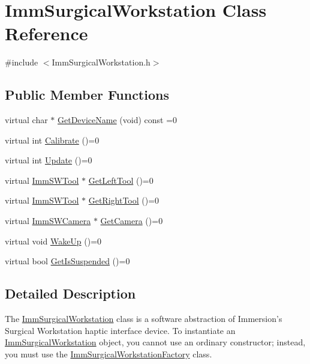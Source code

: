 \hypertarget{classImmSurgicalWorkstation}{
\section{ImmSurgicalWorkstation Class Reference}
\label{classImmSurgicalWorkstation}
}


{\ttfamily \#include $<$ImmSurgicalWorkstation.h$>$}\subsection*{Public Member Functions}
\begin{DoxyCompactItemize}
\item 
virtual char $\ast$ \hyperlink{classImmSurgicalWorkstation_acb5149433694e4e352568ae121ca4def}{GetDeviceName} (void) const =0
\item 
virtual int \hyperlink{classImmSurgicalWorkstation_a5751d512b9d6246956af0694490b0ac6}{Calibrate} ()=0
\item 
virtual int \hyperlink{classImmSurgicalWorkstation_af671066fe27efa7fae77c81cf81840de}{Update} ()=0
\item 
virtual \hyperlink{classImmSWTool}{ImmSWTool} $\ast$ \hyperlink{classImmSurgicalWorkstation_a69564d16bac8c88db28ed7c6ad6e0b4d}{GetLeftTool} ()=0
\item 
virtual \hyperlink{classImmSWTool}{ImmSWTool} $\ast$ \hyperlink{classImmSurgicalWorkstation_a111bb1fc5d84969d91985d73fdeb8cef}{GetRightTool} ()=0
\item 
virtual \hyperlink{classImmSWCamera}{ImmSWCamera} $\ast$ \hyperlink{classImmSurgicalWorkstation_a8bf2d3b8f7113f5c8561322a0f2fc9bd}{GetCamera} ()=0
\item 
virtual void \hyperlink{classImmSurgicalWorkstation_adec269aea68312831b26fedbbb376b42}{WakeUp} ()=0
\item 
virtual bool \hyperlink{classImmSurgicalWorkstation_a822bbdb42bb4745280ba7df7790d0caf}{GetIsSuspended} ()=0
\end{DoxyCompactItemize}


\subsection{Detailed Description}
The \hyperlink{classImmSurgicalWorkstation}{ImmSurgicalWorkstation} class is a software abstraction of Immersion's Surgical Workstation haptic interface device. To instantiate an \hyperlink{classImmSurgicalWorkstation}{ImmSurgicalWorkstation} object, you cannot use an ordinary constructor; instead, you must use the \hyperlink{classImmSurgicalWorkstationFactory}{ImmSurgicalWorkstationFactory} class.

